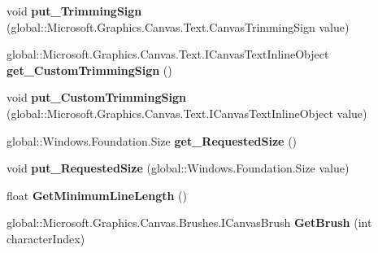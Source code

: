 \begin{DoxyCompactItemize}
void {\bfseries put\+\_\+\+Trimming\+Sign} (global\+::\+Microsoft.\+Graphics.\+Canvas.\+Text.\+Canvas\+Trimming\+Sign value)
\item 
\mbox{\label{class_microsoft_1_1_graphics_1_1_canvas_1_1_text_1_1_canvas_text_layout_a5dc8d39fbd74051d1f66f159c55ef5f3}} 
global\+::\+Microsoft.\+Graphics.\+Canvas.\+Text.\+I\+Canvas\+Text\+Inline\+Object {\bfseries get\+\_\+\+Custom\+Trimming\+Sign} ()
\item 
\mbox{\label{class_microsoft_1_1_graphics_1_1_canvas_1_1_text_1_1_canvas_text_layout_a31d76ac5905938caf13ffb5911f8303a}} 
void {\bfseries put\+\_\+\+Custom\+Trimming\+Sign} (global\+::\+Microsoft.\+Graphics.\+Canvas.\+Text.\+I\+Canvas\+Text\+Inline\+Object value)
\item 
\mbox{\label{class_microsoft_1_1_graphics_1_1_canvas_1_1_text_1_1_canvas_text_layout_adebf612a8df4663884f5d4a38f41ea39}} 
global\+::\+Windows.\+Foundation.\+Size {\bfseries get\+\_\+\+Requested\+Size} ()
\item 
\mbox{\label{class_microsoft_1_1_graphics_1_1_canvas_1_1_text_1_1_canvas_text_layout_a2f3f911ee1fbeb9d18674696d30e71ad}} 
void {\bfseries put\+\_\+\+Requested\+Size} (global\+::\+Windows.\+Foundation.\+Size value)
\item 
\mbox{\label{class_microsoft_1_1_graphics_1_1_canvas_1_1_text_1_1_canvas_text_layout_a238de0e21932bea51610979705559db4}} 
float {\bfseries Get\+Minimum\+Line\+Length} ()
\item 
\mbox{\label{class_microsoft_1_1_graphics_1_1_canvas_1_1_text_1_1_canvas_text_layout_a0c810e107e704b45bc815cf10ec80e67}} 
global\+::\+Microsoft.\+Graphics.\+Canvas.\+Brushes.\+I\+Canvas\+Brush {\bfseries Get\+Brush} (int character\+Index)
\item 
\mbox{\label{class_microsoft_1_1_graphics_1_1_canvas_1_1_text_1_1_canvas_text_layout_ab9ac76cc2bcb25f7196995587caf4e68}} 

\end{DoxyCompactItemize}

